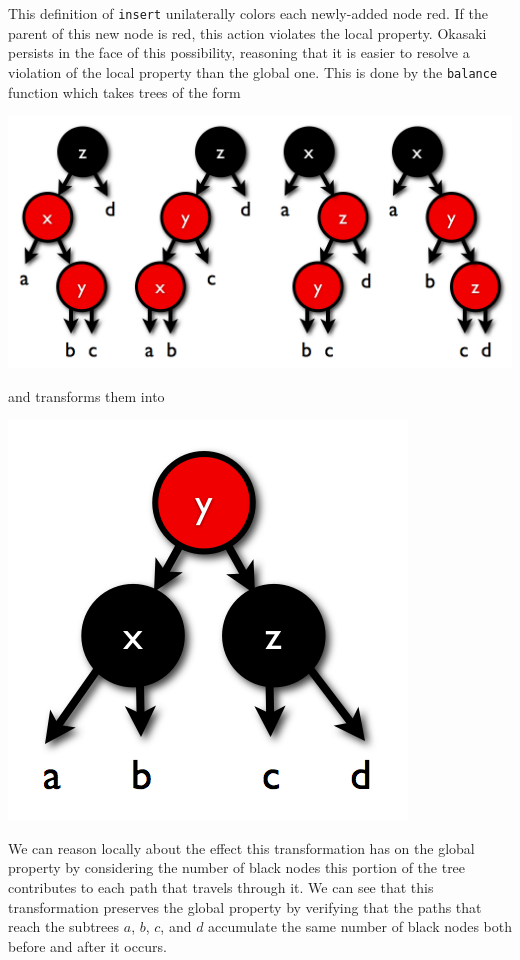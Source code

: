 \documentclass[preprint]{sigplanconf}
\begin{document}
This definition of \texttt{insert} unilaterally colors each newly-added node red. If the parent of this new node is red, this action violates the local property. Okasaki persists in the face of this possibility, reasoning that it is easier to resolve a violation of the local property than the global one. This is done by the \texttt{balance} function which takes trees of the form
\begin{center}
\includegraphics[scale=0.22]{four-cases.png}
\end{center}
and transforms them into
\begin{center}
\includegraphics[scale=0.22]{four-cases-resolved.png}
\end{center}

We can reason locally about the effect this transformation has on the global property by considering the number of black nodes this portion of the tree contributes to each path that travels through it. We can see that this transformation preserves the global property by verifying that the paths that reach the subtrees $a$, $b$, $c$, and $d$ accumulate the same number of black nodes both before and after it occurs.
\end{document}
